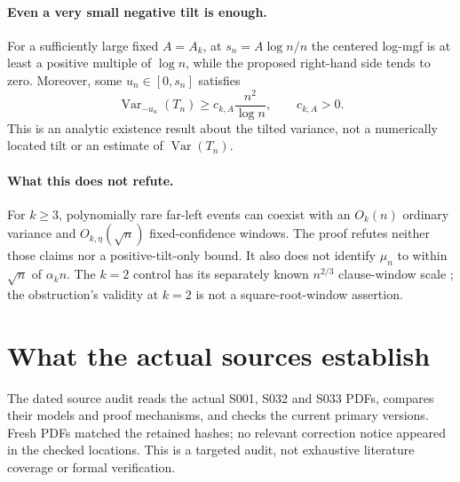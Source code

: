 \documentclass[11pt,a4paper]{article}
\begin{document}
\paragraph{Even a very small negative tilt is enough.}
For a sufficiently large fixed $A=A_k$, at
$s_n=A\log n/n$ the centered log-mgf is at least a positive multiple of
$\log n$, while the proposed right-hand side tends to zero.
Moreover, some $u_n\in[0,s_n]$ satisfies
\[
 \operatorname{Var}_{-u_n}(T_n)
 \ge c_{k,A}\frac{n^2}{\log n},\qquad c_{k,A}>0.
\]
This is an analytic existence result about the tilted variance, not a
numerically located tilt or an estimate of $\operatorname{Var}(T_n)$.

\paragraph{What this does not refute.}
For $k\ge3$, polynomially rare far-left events can coexist with an
$O_k(n)$ ordinary variance and $O_{k,\eta}(\sqrt n)$ fixed-confidence
windows. The proof refutes neither those claims nor a positive-tilt-only
bound. It also does not identify $\mu_n$ to within $\sqrt n$ of
$\alpha_k n$. The $k=2$ control has its separately known
$n^{2/3}$ clause-window scale \citep{bbckw2001}; the obstruction's validity
at $k=2$ is not a square-root-window assertion.

\section{What the actual sources establish}
\label{sec:source-audit}
The dated source audit reads the actual S001, S032 and S033 PDFs, compares
their models and proof mechanisms, and checks the current primary
versions. Fresh PDFs matched the retained hashes; no relevant correction
notice appeared in the checked locations. This is a targeted audit,
not exhaustive literature coverage or formal verification.
\end{document}
